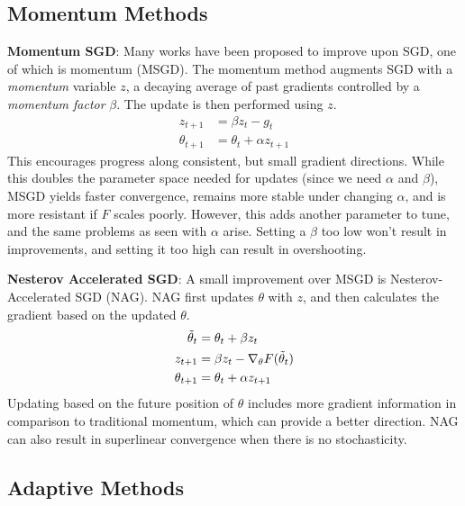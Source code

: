 \subsection{Momentum Methods} \label{sec:momentum}
\textbf{Momentum SGD}: Many works have been proposed to improve upon SGD, one of which is momentum (MSGD). The momentum method augments SGD with a \textit{momentum} variable $z$, a decaying average of past gradients controlled by a \textit{momentum factor} $\beta$. The update is then performed using $z$. 
\begin{align}
    z_{t+1} &= \beta z_{t} - g_t \\
    \theta_{t+1} &= \theta_t + \alpha z_{t+1}
\end{align}
This encourages progress along consistent, but small gradient directions. While this doubles the parameter space needed for updates (since we need $\alpha$ and $\beta$), MSGD yields faster convergence, remains more stable under changing $\alpha$, and is more resistant if $F$ scales poorly. However, this adds another parameter to tune, and the same problems as seen with $\alpha$ arise. Setting a $\beta$ too low won't result in improvements, and setting it too high can result in overshooting.

\textbf{Nesterov Accelerated SGD}: A small improvement over MSGD is Nesterov-Accelerated SGD (NAG). NAG first updates $\theta$ with $z$, and then calculates the gradient based on the updated $\theta$.
\begin{align}
    \Tilde{\theta}_{t} &= \theta_{t} + \beta z_{t} \\
    z_{t+1} &= \beta z_t - \nabla_{\theta} F(\Tilde{\theta}_{t}) \\
    \theta_{t+1} &= \theta_{t} + \alpha z_{t+1}
\end{align}
Updating based on the future position of $\theta$ includes more gradient information in comparison to traditional momentum, which can provide a better direction. NAG can also result in superlinear convergence when there is no stochasticity.

\subsection{Adaptive Methods}

